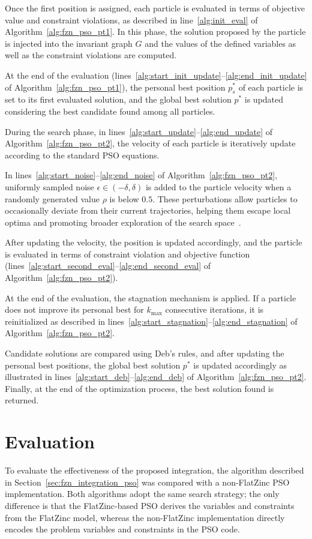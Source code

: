 Once the first position is assigned, each particle is evaluated in terms of objective value and constraint violations, as described in line~\ref{alg:init_eval} of Algorithm~\ref{alg:fzn_pso_pt1}. In this phase, the solution proposed by the particle is injected into the invariant graph $G$ and the values of the defined variables as well as the constraint violations are computed.

At the end of the evaluation (lines~\ref{alg:start_init_update}--\ref{alg:end_init_update} of Algorithm~\ref{alg:fzn_pso_pt1}), the personal best position $p_s^*$ of each particle is set to its first evaluated solution, and the global best solution $p^*$ is updated considering the best candidate found among all particles.

During the search phase, in lines~\ref{alg:start_update}--\ref{alg:end_update} of Algorithm~\ref{alg:fzn_pso_pt2}, the velocity of each particle is iteratively update according to the standard PSO equations. 

In lines~\ref{alg:start_noise}--\ref{alg:end_noise} of Algorithm~\ref{alg:fzn_pso_pt2}, uniformly sampled noise $\epsilon \in (-\delta,\delta)$ is added to the particle velocity when a randomly generated value $\rho$ is below $0.5$. These perturbations allow particles to occasionally deviate from their current trajectories, helping them escape local optima and promoting broader exploration of the search space~\cite{hu2002solving}.

After updating the velocity, the position is updated accordingly, and the particle is evaluated in terms of constraint violation and objective function (lines~\ref{alg:start_second_eval}--\ref{alg:end_second_eval} of Algorithm~\ref{alg:fzn_pso_pt2}).

At the end of the evaluation, the stagnation mechanism is applied. If a particle does not improve its personal best for $k_{\max}$ consecutive iterations, it is reinitialized as described in lines~\ref{alg:start_stagnation}--\ref{alg:end_stagnation} of Algorithm~\ref{alg:fzn_pso_pt2}.

Candidate solutions are compared using Deb's rules, and after updating the personal best positions, the global best solution $p^*$ is updated accordingly as illustrated in lines~\ref{alg:start_deb}--\ref{alg:end_deb}  of Algorithm~\ref{alg:fzn_pso_pt2}. Finally, at the end of the optimization process, the best solution found is returned.


\section{Evaluation}
To evaluate the effectiveness of the proposed integration, the algorithm described in Section~\ref{sec:fzn_integration_pso} was compared with a non-FlatZinc PSO implementation. Both algorithms adopt the same search strategy; the only difference is that the FlatZinc-based PSO derives the variables and constraints from the FlatZinc model, whereas the non-FlatZinc implementation directly encodes the problem variables and constraints in the PSO code.

